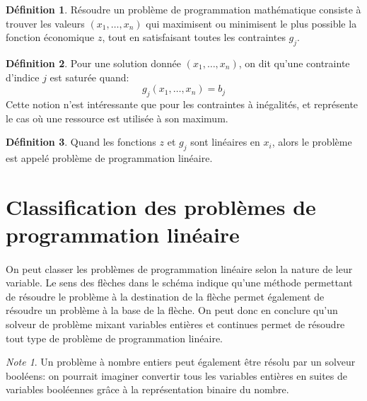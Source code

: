 \documentclass[a4paper]{report}
\theoremstyle{definition}
\newtheorem*{definition}{Définition}
\theoremstyle{remark}
\newtheorem*{note}{Note}
\theoremstyle{plain}
\begin{document}
\begin{definition}
Résoudre un problème de programmation mathématique consiste à trouver les
valeurs \((x_1,\dots,x_n)\) qui maximisent ou minimisent le plus possible la
fonction économique \(z\), tout en satisfaisant toutes les contraintes \(g_j\).
\end{definition}

\begin{definition}
Pour une solution donnée \((x_1,\dots,x_n)\), on dit qu'une contrainte
d'indice \(j\) est saturée quand:
\[g_j(x_1,\dots,x_n)=b_j\]
Cette notion n'est intéressante que pour les contraintes à inégalités, et
représente le cas où une ressource est utilisée à son maximum.
\end{definition}

\begin{definition}
Quand les fonctions \(z\) et \(g_j\) sont linéaires en \(x_i\), alors le
problème est appelé problème de programmation linéaire.
\end{definition}

\section{Classification des problèmes de programmation linéaire}

\paragraph{}On peut classer les problèmes de programmation linéaire selon la
nature de leur variable. Le sens des flèches dans le schéma indique qu'une
méthode permettant de résoudre le problème à la destination de la flèche permet
également de résoudre un problème à la base de la flèche. On peut donc en
conclure qu'un solveur de problème mixant variables entières et continues permet
de résoudre tout type de problème de programmation linéaire.
\begin{note}
Un problème à nombre entiers peut également être résolu par un
solveur booléens: on pourrait imaginer convertir tous les variables entières en
suites de variables booléennes grâce à la représentation binaire du nombre.
\end{note}
\end{document}
